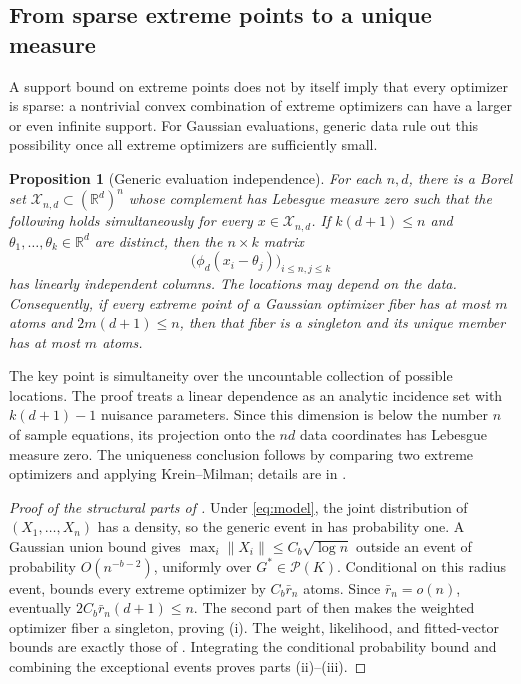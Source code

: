 \documentclass[11pt]{article}
\newtheorem{proposition}[theorem]{Proposition}
\theoremstyle{definition}
\theoremstyle{remark}
\newcommand{\Pcal}{\mathcal P}
\newcommand{\RR}{\mathbb R}
\newcommand{\norm}[1]{\lVert #1\rVert}
\begin{document}
\subsection{From sparse extreme points to a unique measure}

A support bound on extreme points does not by itself imply that every
optimizer is sparse: a nontrivial convex combination of extreme optimizers
can have a larger or even infinite support.  For Gaussian evaluations,
generic data rule out this possibility once all extreme optimizers are
sufficiently small.

\begin{proposition}[Generic evaluation independence]
\label{prop:generic}
For each $n,d$, there is a Borel set $\mathcal X_{n,d}\subset(\RR^d)^n$ whose
complement has Lebesgue measure zero such that the following holds
simultaneously for every $x\in\mathcal X_{n,d}$.  If
$k(d+1)\le n$ and $\theta_1,\ldots,\theta_k\in\RR^d$ are distinct, then the
$n\times k$ matrix
\begin{equation}\label{eq:evaluation-matrix}
 \bigl(\phi_d(x_i-\theta_j)\bigr)_{i\le n,j\le k}
\end{equation}
has linearly independent columns.  The locations may depend on the data.
Consequently, if every extreme point of a Gaussian optimizer fiber has at
most $m$ atoms and $2m(d+1)\le n$, then that fiber is a singleton and its
unique member has at most $m$ atoms.
\end{proposition}

The key point is simultaneity over the uncountable collection of possible
locations.  The proof treats a linear dependence as an analytic incidence
set with $k(d+1)-1$ nuisance parameters.  Since this dimension is below the
number $n$ of sample equations, its projection onto the $nd$ data coordinates
has Lebesgue measure zero.  The uniqueness conclusion follows by comparing
two extreme optimizers and applying Krein--Milman; details are in
.

\begin{proof}[Proof of the structural parts of ]
Under \eqref{eq:model}, the joint distribution of
$(X_1,\ldots,X_n)$ has a density, so the generic event in
 has probability one.  A Gaussian union bound gives
$\max_i\norm{X_i}\le C_b\sqrt{\log n}$ outside an event of probability
$O(n^{-b-2})$, uniformly over $G^*\in\Pcal(K)$.  Conditional on this radius
event,  bounds every extreme optimizer by
$C_b\bar r_n$ atoms.  Since $\bar r_n=o(n)$, eventually
$2C_b\bar r_n(d+1)\le n$.  The second part of  then makes
the weighted optimizer fiber a singleton, proving (i).
The weight, likelihood, and fitted-vector bounds are exactly those of
.  Integrating the conditional probability bound and
combining the exceptional events proves parts (ii)--(iii).
\end{proof}
\end{document}
